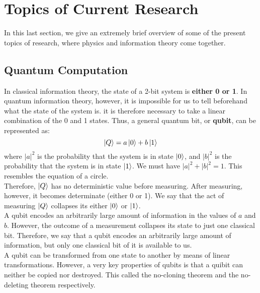 \documentclass[letterpaper,10pt,english]{article}
\begin{document}
{\section{Topics of Current Research}
In this last section, we give an extremely brief overview of some of the present topics of research, where physics and information theory come together. 
\subsection{Quantum Computation}
In classical information theory, the state of a 2-bit system is \textbf{either 0 or 1}. In quantum information theory, however, it is impossible for us to tell beforehand what the state of the system is. it is therefore necessary to take a linear combination of the 0 and 1 states. Thus, a general quantum bit, or \textbf{qubit}, can be represented as: 
\begin{equation}
\ket{Q}=a\ket{0} +b\ket{1}
\end{equation}
where $|a|^2$ is the probability that the system is in state $\ket{0}$, and $|b|^2$ is the probability that the system is in state $\ket{1}$. We must have $|a|^2+|b|^2=1$. This resembles the equation of a circle. \\
Therefore, $\ket{Q}$ has no deterministic value before measuring. After measuring, however, it becomes determinate (either 0 or 1). We say that the act of measuring $\ket{Q}$ collapses its either $\ket{0}$ or $\ket{1}$. \\
A qubit encodes an arbitrarily large amount of information in the values of $a$ and $b$. However, the outcome of a measurement collapses its state to just one classical bit. Therefore, we say that a qubit encodes an arbitrarily large amount of information, but only one classical bit of it is available to us. \\
A qubit can be transformed from one state to another by means of linear transformations. However, a very key properties of qubits is that a quibit can neither be copied nor destroyed. This called the no-cloning theorem and the no-deleting theorem respectively. 
}
\end{document}
